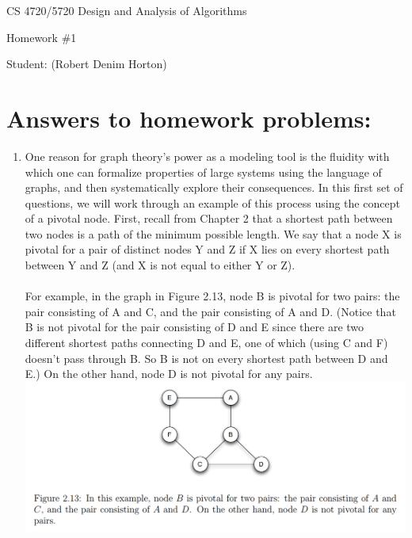 \documentclass[11pt]{article}
\begin{document}
 

\rhead{\today}

\begin{center}\begin{Large}
CS 4720/5720 Design and Analysis of Algorithms

Homework \#1

Student: (Robert Denim Horton)
\end{Large}
\end{center}


\section*{Answers to homework problems:}

\begin{enumerate}
\item One reason for graph theory’s power as a modeling tool is the fluidity with which one can formalize properties of large systems using the language of graphs, and then systematically explore their consequences. In this first set of questions, we will work through an example of this process using the concept of a pivotal node. First, recall from Chapter 2 that a shortest path between two nodes is a path of the minimum possible length. We say that a node X is pivotal for a pair of distinct nodes Y and Z if X lies on every shortest path between Y and Z (and X is not equal to either Y or Z).\\\\
For example, in the graph in Figure 2.13, node B is pivotal for two pairs: the pair consisting of A and C, and the pair consisting of A and D. (Notice that B is not pivotal for the pair consisting of D and E since there are two different shortest paths connecting D and E, one of which (using C and F) doesn’t pass through B. So B is not on every shortest path between D and E.) On the other hand, node D is not pivotal for any pairs.\\
\includegraphics[scale=0.9]{Figure_12_3}

\end{enumerate}
\end{document}
